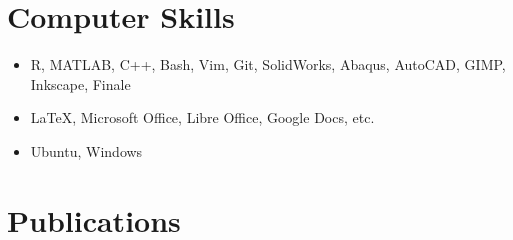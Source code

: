 \documentclass[letterpaper]{article}
\begin{document}
\section{Computer Skills}
\begin{center}
\begin{itemize}
\item R, MATLAB, C++, Bash, Vim, Git, SolidWorks, Abaqus, AutoCAD, GIMP, Inkscape, Finale
\item \LaTeX, Microsoft Office, Libre Office, Google Docs, etc.
\item Ubuntu, Windows
\end{itemize}
% 
% 
\end{center}


\section{Publications}
\nocite{shields2016design} %
\printbibliography

\end{document}
